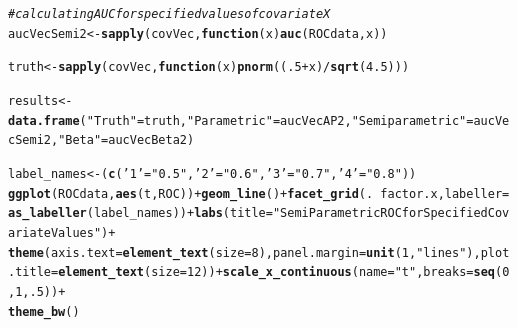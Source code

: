 \documentclass[10pt, title page]{article}\usepackage[]{graphicx}\usepackage[]{color}
\makeatletter
\newcommand{\hlnum}[1]{\textcolor[rgb]{0.686,0.059,0.569}{#1}}%
\newcommand{\hlstr}[1]{\textcolor[rgb]{0.192,0.494,0.8}{#1}}%
\newcommand{\hlcom}[1]{\textcolor[rgb]{0.678,0.584,0.686}{\textit{#1}}}%
\newcommand{\hlopt}[1]{\textcolor[rgb]{0,0,0}{#1}}%
\newcommand{\hlstd}[1]{\textcolor[rgb]{0.345,0.345,0.345}{#1}}%
\newcommand{\hlkwa}[1]{\textcolor[rgb]{0.161,0.373,0.58}{\textbf{#1}}}%
\newcommand{\hlkwb}[1]{\textcolor[rgb]{0.69,0.353,0.396}{#1}}%
\newcommand{\hlkwc}[1]{\textcolor[rgb]{0.333,0.667,0.333}{#1}}%
\newcommand{\hlkwd}[1]{\textcolor[rgb]{0.737,0.353,0.396}{\textbf{#1}}}%
\newenvironment{kframe}{%
 \def\at@end@of@kframe{}%
 \ifinner\ifhmode%
  \def\at@end@of@kframe{\end{minipage}}%
  \begin{minipage}{\columnwidth}%
 \fi\fi%
 \def\FrameCommand##1{\hskip\@totalleftmargin \hskip-\fboxsep
 \colorbox{shadecolor}{##1}\hskip-\fboxsep
     \hskip-\linewidth \hskip-\@totalleftmargin \hskip\columnwidth}%
 \MakeFramed {\advance\hsize-\width
   \@totalleftmargin\z@ \linewidth\hsize
   \@setminipage}}%
 {\par\unskip\endMakeFramed%
 \at@end@of@kframe}
\newenvironment{knitrout}{}{} %
\makeatother
\begin{document}
\begin{knitrout}
\color{fgcolor}\begin{kframe}
\begin{alltt}
\hlcom{# calculating AUC for specified values of covariate X}
\hlstd{aucVecSemi2} \hlkwb{<-} \hlkwd{sapply}\hlstd{(covVec,} \hlkwa{function}\hlstd{(}\hlkwc{x}\hlstd{)} \hlkwd{auc}\hlstd{(ROCdata, x))}


\hlstd{truth} \hlkwb{<-} \hlkwd{sapply}\hlstd{(covVec,} \hlkwa{function}\hlstd{(}\hlkwc{x}\hlstd{)} \hlkwd{pnorm}\hlstd{((}\hlnum{.5} \hlopt{+} \hlstd{x)}\hlopt{/}\hlkwd{sqrt}\hlstd{(}\hlnum{4.5}\hlstd{)))}

\hlstd{results} \hlkwb{<-} \hlkwd{data.frame}\hlstd{(}\hlstr{"Truth"} \hlstd{= truth,} \hlstr{"Parametric"} \hlstd{= aucVecAP2,} \hlstr{"Semiparametric"} \hlstd{= aucVecSemi2,} \hlstr{"Beta"} \hlstd{= aucVecBeta2)}



\hlstd{label_names} \hlkwb{<-} \hlstd{(}\hlkwd{c}\hlstd{(}\hlstr{'1'} \hlstd{=} \hlstr{"0.5"}\hlstd{,} \hlstr{'2'} \hlstd{=} \hlstr{"0.6"}\hlstd{,} \hlstr{'3'} \hlstd{=} \hlstr{"0.7"}\hlstd{,} \hlstr{'4'} \hlstd{=} \hlstr{"0.8"}\hlstd{))}
\hlkwd{ggplot}\hlstd{(ROCdata,} \hlkwd{aes}\hlstd{(t, ROC))} \hlopt{+} \hlkwd{geom_line}\hlstd{()} \hlopt{+} \hlkwd{facet_grid}\hlstd{(.}\hlopt{~}\hlstd{factor.x,} \hlkwc{labeller} \hlstd{=} \hlkwd{as_labeller}\hlstd{(label_names))} \hlopt{+} \hlkwd{labs}\hlstd{(}\hlkwc{title} \hlstd{=} \hlstr{"SemiParametric ROC for Specified Covariate Values"}\hlstd{)} \hlopt{+}
 \hlkwd{theme}\hlstd{(}\hlkwc{axis.text}\hlstd{=}\hlkwd{element_text}\hlstd{(}\hlkwc{size}\hlstd{=}\hlnum{8}\hlstd{),} \hlkwc{panel.margin} \hlstd{=} \hlkwd{unit}\hlstd{(}\hlnum{1}\hlstd{,} \hlstr{"lines"}\hlstd{),} \hlkwc{plot.title} \hlstd{=} \hlkwd{element_text}\hlstd{(}\hlkwc{size}\hlstd{=}\hlnum{12}\hlstd{))} \hlopt{+} \hlkwd{scale_x_continuous}\hlstd{(}\hlkwc{name}\hlstd{=}\hlstr{"t"}\hlstd{,} \hlkwc{breaks}\hlstd{=}\hlkwd{seq}\hlstd{(}\hlnum{0}\hlstd{,}\hlnum{1}\hlstd{,}\hlnum{.5}\hlstd{))} \hlopt{+}
  \hlkwd{theme_bw}\hlstd{()}
\end{alltt}



\end{kframe}
\end{knitrout}
\end{document}
